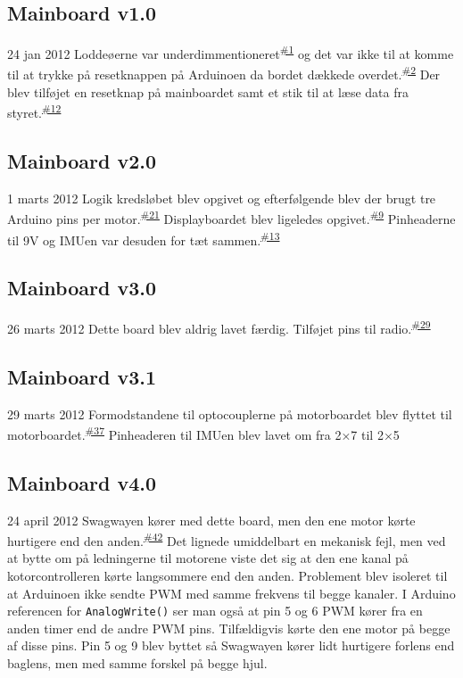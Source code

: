 \documentclass[a4paper,twoside,article,danish,table]{memoir}
\newcommand{\boarddate}[1]{\textcolor{blue!80!black}{#1}}
\newcommand{\issue}[1]{\textsuperscript{\textcolor{blue!80!black}{\href{https://github.com/neic/Swagway/issues/#1}{\##1}}}}
\begin{document}
\subsection{Mainboard v1.0}
\boarddate{24 jan 2012}
Loddeøerne var underdimmentioneret\issue{1} og det var ikke til at komme til at trykke på resetknappen på Arduinoen da bordet dækkede overdet.\issue{2} Der blev tilføjet en resetknap på mainboardet samt et stik til at læse data fra styret.\issue{12}

\subsection{Mainboard v2.0}
\boarddate{1 marts 2012}
Logik kredsløbet blev opgivet og efterfølgende blev der brugt tre Arduino pins per motor.\issue{21} Displayboardet blev ligeledes opgivet.\issue{9} Pinheaderne til 9V og IMUen var desuden for tæt sammen.\issue{13}

\subsection{Mainboard v3.0}
\boarddate{26 marts 2012} Dette board blev aldrig lavet færdig.
Tilføjet pins til radio.\issue{29}

\subsection{Mainboard v3.1}
\boarddate{29 marts 2012}
Formodstandene til optocouplerne på motorboardet blev flyttet til motorboardet.\issue{37}
Pinheaderen til IMUen blev lavet om fra 2×7 til 2×5

\subsection{Mainboard v4.0}\label{sec:main40}
\boarddate{24 april 2012}
Swagwayen kører med dette board, men den ene motor kørte hurtigere end den anden.\issue{42} Det lignede umiddelbart en mekanisk fejl, men ved at bytte om på ledningerne til motorene viste det sig at den ene kanal på kotorcontrolleren kørte langsommere end den anden. Problement blev isoleret til at Arduinoen ikke sendte PWM med samme frekvens til begge kanaler. I Arduino referencen for \texttt{AnalogWrite()} ser man også at pin 5 og 6 PWM kører fra en anden timer end de andre PWM pins. Tilfældigvis kørte den ene motor på begge af disse pins. Pin 5 og 9 blev byttet så Swagwayen kører lidt hurtigere forlens end baglens, men med samme forskel på begge hjul.
\end{document}
